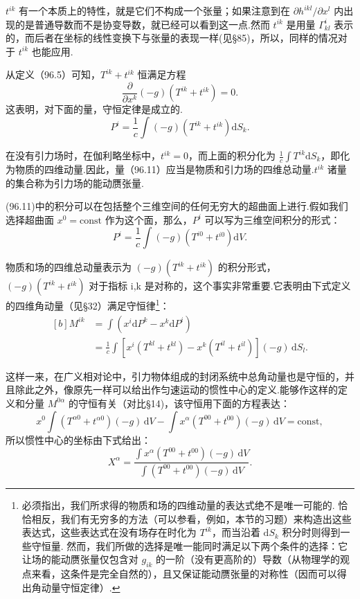 $t^{ik}$ 有一个本质上的特性，就是它们不构成一个张量；如果注意到在 $\partial h^{ikl}/\partial x^l$ 内出现的是普通导数而不是协变导数，就已经可以看到这一点.然而 $t^{ik}$ 是用量 $\Gamma^i_{kl}$ 表示的，而后者在坐标的线性变换下与张量的表现一样(见§85)，所以，同样的情况对于 $t^{ik}$ 也能应用.

从定义（96.5）可知，$T^{ik}+t^{ik}$ 恒满足方程
\begin{equation}
  \frac{\partial}{\partial x^k}(-g)\left(T^{ik}+t^{ik}\right)=0.
\end{equation}
这表明，对下面的量，守恒定律是成立的.
\begin{equation}
  P^i=\frac{1}{c}\int(-g)\left(T^{ik}+t^{ik}\right)\mathrm{d}S_k.
\end{equation}

在没有引力场时，在伽利略坐标中，$t^{ik}=0$，而上面的积分化为 $\frac{1}{c}\int T^{ik}\mathrm{d}S_k$，即化为物质的四维动量.因此，量（96.11）应当是物质和引力场的四维总动量.$t^{ik}$ 诸量的集合称为引力场的能动赝张量.

(96.11)中的积分可以在包括整个三维空间的任何无穷大的超曲面上进行.假如我们选择超曲面 $x^0=\mathrm{const}$ 作为这个面，那么，$P^i$ 可以写为三维空间积分的形式：
\begin{equation}
  P^i=\frac{1}{c}\int(-g)\left(T^{i0}+t^{i0}\right)\mathrm{d}V.
\end{equation}

物质和场的四维总动量表示为 $(-g)(T^{ik}+t^{ik})$ 的积分形式，$(-g)(T^{ik}+t^{ik})$ 对于指标 i,k 是对称的，这个事实非常重要.它表明由下式定义的四维角动量（见§32）满足守恒律\footnote{必须指出，我们所求得的物质和场的四维动量的表达式绝不是唯一可能的. 恰恰相反，我们有无穷多的方法（可以参看，例如，本节的习题）来构造出这些表达式，这些表达式在没有场存在时化为 $T^{ik}$，而当沿着 $\mathrm{d}S_k$ 积分时则得到一些守恒量. 然而，我们所做的选择是唯一能同时满足以下两个条件的选择：它让场的能动赝张量仅包含对 $g_{ik}$ 的一阶（没有更高阶的）导数（从物理学的观点来看，这条件是完全自然的），且又保证能动赝张量的对称性（因而可以得出角动量守恒定律）.}：
\begin{equation}
\begin{aligned}[b]
  M^{ik}&=\int\left(x^i\mathrm{d}P^k-x^k\mathrm{d}P^i\right)\\
  &=\frac{1}{c}\int\left[x^i\left(T^{kl}+t^{kl}\right)
  -x^k\left(T^{il}+t^{il}\right)\right](-g)\,\mathrm{d}S_l.
\end{aligned}
\end{equation}

这样一来，在广义相对论中，引力物体组成的封闭系统中总角动量也是守恒的，并且除此之外，像原先一样可以给出作匀速运动的惯性中心的定义.能够作这样的定义和分量 $M^{0\alpha}$ 的守恒有关（对比§14)，该守恒用下面的方程表达：
\begin{equation*}
  x^0\int\left(T^{\alpha 0}+t^{\alpha 0}\right)(-g)\,\mathrm{d}V
  -\int x^{\alpha}\left(T^{00}+t^{00}\right)(-g)\,\mathrm{d}V
  =\mathrm{const},
\end{equation*}
所以惯性中心的坐标由下式给出：
\begin{equation}
  X^{\alpha}=
  \frac{\displaystyle\int x^{\alpha}\left(T^{00}+t^{00}\right)(-g)\,\mathrm{d}V}
  {\displaystyle\int\left(T^{00}+t^{00}\right)(-g)\,\mathrm{d}V}.
\end{equation}

